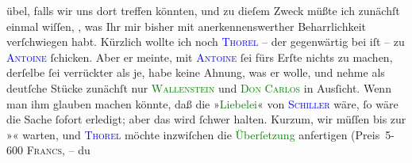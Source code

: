                übel,  falls wir uns dort treffen könnten, und zu dieſem Zweck müßte ich zunächſt
               einmal wiſſen, \label{K_L02781-4v}\label{K_L02781-4h}, was Ihr mir bisher mit anerkennenswerther Beharrlichkeit
               verſchwiegen habt.\pend
           \pstart
           Kürzlich wollte ich noch \textsc{\textcolor{blue}{Thorel}{}\ledrightnote{\textcolor{blue}{Jean Thorel}}} – der gegenwärtig bei \label{K_L02781-98v}\label{K_L02781-98h} iſt – zu \textsc{\textcolor{blue}{Antoine}{}\ledrightnote{\textcolor{blue}{André Antoine}}} ſchicken. Aber er meinte, mit \textsc{\textcolor{blue}{Antoine}{}\ledrightnote{\textcolor{blue}{André Antoine}}} ſei fürs Erſte {\pb}nichts zu machen, derſelbe ſei
               verrückter als je, habe keine Ahnung, was er wolle, und nehme als deutſche Stücke
               zunächſt nur \textsc{\textcolor{green}{Wallenstein}{}\ledrightnote{\textcolor{green}{Wallenstein}}} und \textsc{\textcolor{green}{Don Carlos}{}\ledrightnote{\textcolor{green}{Don Karlos, Infant von Spanien}}} in Ausſicht. Wenn man ihm glauben machen könnte, daß die »\textcolor{green}{Liebelei}{}\ledrightnote{\textcolor{green}{Liebelei. Schauspiel in drei Akten}}« von \textsc{\textcolor{blue}{Schiller}{}\ledrightnote{\textcolor{blue}{Friedrich von Schiller}}} wäre, ſo wäre die Sache ſofort erledigt; aber das wird ſchwer halten. Kurzum,
               wir müſſen bis zur »\label{K_L02781-5v}\label{K_L02781-5h}« warten, und \textsc{\textcolor{blue}{Thorel}{}\ledrightnote{\textcolor{blue}{Jean Thorel}}} möchte inzwiſchen die \textcolor{green}{Überſetzung}{} anfertigen (Preis 5-600 \textsc{Francs}, – du
